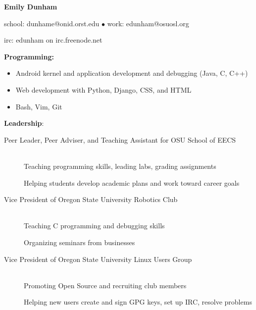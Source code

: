 \documentclass[11pt]{article}
\begin{document}
\centerline{{\LARGE \bf Emily Dunham}}

\smallskip

\centerline{{school: dunhame@onid.orst.edu $\bullet$ work:
edunham@osuosl.org}}
\centerline{{irc: edunham on irc.freenode.net}}

\hrulefill

\bigskip



\smallskip

{\large \bf Programming:}

    \begin{itemize}
        \item Android kernel and application development and debugging (Java, C, C++)
        \item Web development with Python, Django, CSS, and HTML
        \item Bash, Vim, Git
    \end{itemize}

{\large \bf Leadership}:

\begin{description}

    \item[Peer Leader, Peer Adviser, and Teaching Assistant for OSU School of EECS]

        \hfill \\ 
        Teaching programming skills, leading labs, grading assignments
        
        Helping students develop academic plans and work toward career goals

    \item[Vice President of Oregon State University Robotics Club]

        \hfill \\
        Teaching C programming and debugging skills

        Organizing seminars from businesses

    \item[Vice President of Oregon State University Linux Users Group]

        \hfill \\
        Promoting Open Source and recruiting club members

        Helping new users create and sign GPG keys, set up IRC, resolve problems
\end{description}

\end{document}

